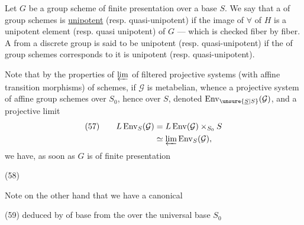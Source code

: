 Let $G$ be a group scheme  of finite presentation over a base $S$.
We say that a  of group schemes
is  \uline{unipotent} (resp. quasi-unipotent) if the image of $\forall$  of $H$ is a unipotent element (resp. quasi unipotent) of $G$ --- which is checked fiber by fiber. A  from a discrete group
is said to be unipotent (resp. quasi-unipotent) if the  of group schemes   corresponds to it
is unipotent (resp. quasi-unipotent).



Note that by the properties of $\varprojlim$ of filtered projective systems (with affine transition morphisms)  of schemes, if $\mathcal{G}$ is metabelian, whence a projective system of affine group schemes over $S_0$, hence over $S$, denoted $\operatorname{Env}_{\unsure{\underline{S}|S}}(\mathcal{G})$, and a projective limit
\[
\begin{aligned}
(57)\qquad L\operatorname{Env}_S(\mathcal{G})
 &=L\operatorname{Env}(\mathcal{G})\times_{S_0}S\\
 &\simeq\varprojlim\operatorname{Env}_S(\mathcal{G}),
\end{aligned}
\]
we have, as soon as $G$ is  of finite presentation

(58)\quad
{}

Note on the other hand that we have a  canonical 

(59)\quad
{}
deduced by  of base from the  over the universal base $S_0$

